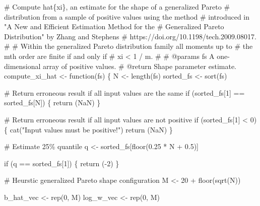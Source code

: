 \documentclass[
  letterpaper,
  DIV=11,
  numbers=noendperiod]{scrartcl}
\newenvironment{Shaded}{\begin{snugshade}}{\end{snugshade}}
\newcommand{\CommentTok}[1]{\textcolor[rgb]{0.37,0.37,0.37}{#1}}
\newcommand{\ControlFlowTok}[1]{\textcolor[rgb]{0.00,0.23,0.31}{#1}}
\newcommand{\DecValTok}[1]{\textcolor[rgb]{0.68,0.00,0.00}{#1}}
\newcommand{\FloatTok}[1]{\textcolor[rgb]{0.68,0.00,0.00}{#1}}
\newcommand{\NormalTok}[1]{\textcolor[rgb]{0.00,0.23,0.31}{#1}}
\newcommand{\OperatorTok}[1]{\textcolor[rgb]{0.37,0.37,0.37}{#1}}
\newcommand{\StringTok}[1]{\textcolor[rgb]{0.13,0.47,0.30}{#1}}
\begin{document}
\begin{Shaded}
\begin{Highlighting}[]
\CommentTok{\# Compute hat\{xi\}, an estimate for the shape of a generalized Pareto }
\CommentTok{\# distribution from a sample of positive values using the method }
\CommentTok{\# introduced in "A New and Efficient Estimation Method for the }
\CommentTok{\# Generalized Pareto Distribution" by Zhang and Stephens }
\CommentTok{\# https://doi.org/10.1198/tech.2009.08017.}
\CommentTok{\# }
\CommentTok{\# Within the generalized Pareto distribution family all moments up to }
\CommentTok{\# the mth order are finite if and only if }
\CommentTok{\#  xi \textless{} 1 / m.}
\CommentTok{\#}
\CommentTok{\# @params fs A one{-}dimensional array of positive values.}
\CommentTok{\# @return Shape parameter estimate.}
\NormalTok{compute\_xi\_hat }\OperatorTok{\textless{}{-}}\NormalTok{ function(fs) \{}
\NormalTok{  N }\OperatorTok{\textless{}{-}}\NormalTok{ length(fs)}
\NormalTok{  sorted\_fs }\OperatorTok{\textless{}{-}}\NormalTok{ sort(fs)}

  \CommentTok{\# Return erroneous result if all input values are the same }
  \ControlFlowTok{if}\NormalTok{ (sorted\_fs[}\DecValTok{1}\NormalTok{] }\OperatorTok{==}\NormalTok{ sorted\_fs[N]) \{}
    \ControlFlowTok{return}\NormalTok{ (NaN)}
\NormalTok{  \}}

  \CommentTok{\# Return erroneous result if all input values are not positive}
  \ControlFlowTok{if}\NormalTok{ (sorted\_fs[}\DecValTok{1}\NormalTok{] }\OperatorTok{\textless{}} \DecValTok{0}\NormalTok{) \{}
\NormalTok{    cat(}\StringTok{"Input values must be positive!"}\NormalTok{)}
    \ControlFlowTok{return}\NormalTok{ (NaN)}
\NormalTok{  \}}

  \CommentTok{\# Estimate 25\% quantile}
\NormalTok{  q }\OperatorTok{\textless{}{-}}\NormalTok{ sorted\_fs[floor(}\FloatTok{0.25} \OperatorTok{*}\NormalTok{ N }\OperatorTok{+} \FloatTok{0.5}\NormalTok{)]}

  \ControlFlowTok{if}\NormalTok{ (q }\OperatorTok{==}\NormalTok{ sorted\_fs[}\DecValTok{1}\NormalTok{]) \{}
    \ControlFlowTok{return}\NormalTok{ (}\OperatorTok{{-}}\DecValTok{2}\NormalTok{)}
\NormalTok{  \}}

  \CommentTok{\# Heurstic generalized Pareto shape configuration}
\NormalTok{  M }\OperatorTok{\textless{}{-}} \DecValTok{20} \OperatorTok{+}\NormalTok{ floor(sqrt(N))}

\NormalTok{  b\_hat\_vec }\OperatorTok{\textless{}{-}}\NormalTok{ rep(}\DecValTok{0}\NormalTok{, M)}
\NormalTok{  log\_w\_vec }\OperatorTok{\textless{}{-}}\NormalTok{ rep(}\DecValTok{0}\NormalTok{, M)}


\end{Highlighting}
\end{Shaded}
\end{document}
